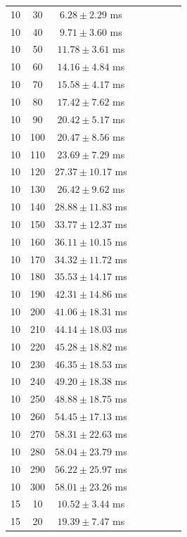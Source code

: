 \begin{table}[htbp]
{\begin{tabular}{|c|c|c||c|c|c|c|c|}
10 & 30 & $6.28 \pm 2.29$ ms &  &  &  &  &  \\
10 & 40 & $9.71 \pm 3.60$ ms &  &  &  &  &  \\
10 & 50 & $11.78 \pm 3.61$ ms &  &  &  &  &  \\
10 & 60 & $14.16 \pm 4.84$ ms &  &  &  &  &  \\
10 & 70 & $15.58 \pm 4.17$ ms &  &  &  &  &  \\
10 & 80 & $17.42 \pm 7.62$ ms &  &  &  &  &  \\
10 & 90 & $20.42 \pm 5.17$ ms &  &  &  &  &  \\
10 & 100 & $20.47 \pm 8.56$ ms &  &  &  &  &  \\
10 & 110 & $23.69 \pm 7.29$ ms &  &  &  &  &  \\
10 & 120 & $27.37 \pm 10.17$ ms &  &  &  &  &  \\
10 & 130 & $26.42 \pm 9.62$ ms &  &  &  &  &  \\
10 & 140 & $28.88 \pm 11.83$ ms &  &  &  &  &  \\
10 & 150 & $33.77 \pm 12.37$ ms &  &  &  &  &  \\
10 & 160 & $36.11 \pm 10.15$ ms &  &  &  &  &  \\
10 & 170 & $34.32 \pm 11.72$ ms &  &  &  &  &  \\
10 & 180 & $35.53 \pm 14.17$ ms &  &  &  &  &  \\
10 & 190 & $42.31 \pm 14.86$ ms &  &  &  &  &  \\
10 & 200 & $41.06 \pm 18.31$ ms &  &  &  &  &  \\
10 & 210 & $44.14 \pm 18.03$ ms &  &  &  &  &  \\
10 & 220 & $45.28 \pm 18.82$ ms &  &  &  &  &  \\
10 & 230 & $46.35 \pm 18.53$ ms &  &  &  &  &  \\
10 & 240 & $49.20 \pm 18.38$ ms &  &  &  &  &  \\
10 & 250 & $48.88 \pm 18.75$ ms &  &  &  &  &  \\
10 & 260 & $54.45 \pm 17.13$ ms &  &  &  &  &  \\
10 & 270 & $58.31 \pm 22.63$ ms &  &  &  &  &  \\
10 & 280 & $58.04 \pm 23.79$ ms &  &  &  &  &  \\
10 & 290 & $56.22 \pm 25.97$ ms &  &  &  &  &  \\
10 & 300 & $58.01 \pm 23.26$ ms &  &  &  &  &  \\
\hline
15 & 10 & $10.52 \pm 3.44$ ms &  &  &  &  &  \\
15 & 20 & $19.39 \pm 7.47$ ms &  &  &  &  &  \\

\end{tabular}}
\end{table}
